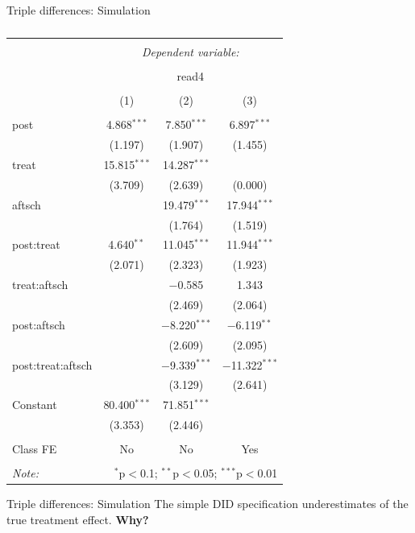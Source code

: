 \documentclass[
  ignorenonframetext,
]{beamer}
\begin{document}
\begin{frame}[fragile]{Triple differences: Simulation}
\begin{table}[!htbp] \centering 
  \caption{} 
  \label{} 
\begin{tabular}{@{\extracolsep{5pt}}lccc} 
\\[-1.8ex]\hline 
\hline \\[-1.8ex] 
 & \multicolumn{3}{c}{\textit{Dependent variable:}} \\ 
\cline{2-4} 
\\[-1.8ex] & \multicolumn{3}{c}{read4} \\ 
\\[-1.8ex] & (1) & (2) & (3)\\ 
\hline \\[-1.8ex] 
 post & 4.868$^{***}$ & 7.850$^{***}$ & 6.897$^{***}$ \\ 
  & (1.197) & (1.907) & (1.455) \\ 
  treat & 15.815$^{***}$ & 14.287$^{***}$ &  \\ 
  & (3.709) & (2.639) & (0.000) \\ 
  aftsch &  & 19.479$^{***}$ & 17.944$^{***}$ \\ 
  &  & (1.764) & (1.519) \\ 
  post:treat & 4.640$^{**}$ & 11.045$^{***}$ & 11.944$^{***}$ \\ 
  & (2.071) & (2.323) & (1.923) \\ 
  treat:aftsch &  & $-$0.585 & 1.343 \\ 
  &  & (2.469) & (2.064) \\ 
  post:aftsch &  & $-$8.220$^{***}$ & $-$6.119$^{**}$ \\ 
  &  & (2.609) & (2.095) \\ 
  post:treat:aftsch &  & $-$9.339$^{***}$ & $-$11.322$^{***}$ \\ 
  &  & (3.129) & (2.641) \\ 
  Constant & 80.400$^{***}$ & 71.851$^{***}$ &  \\ 
  & (3.353) & (2.446) &  \\ 
 \hline \\[-1.8ex] 
Class FE & No & No & Yes \\ 
\hline 
\hline \\[-1.8ex] 
\textit{Note:}  & \multicolumn{3}{r}{$^{*}$p$<$0.1; $^{**}$p$<$0.05; $^{***}$p$<$0.01} \\ 
\end{tabular} 
\end{table}
\end{frame}

\begin{frame}{Triple differences: Simulation}
\protect\hypertarget{triple-differences-simulation-4}{}
The simple DID specification underestimates of the true treatment
effect. \textbf{Why?}
\end{frame}
\end{document}
